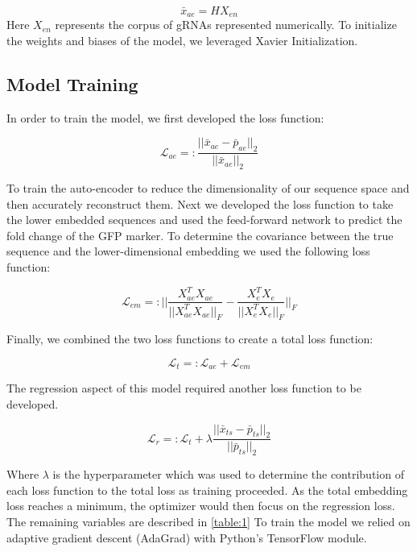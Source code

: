 \documentclass[times]{zHenriquesLab-StyleBioRxiv}
\begin{document}
\begin{equation}
\bar{x}_{ae} = HX_{en}
\end{equation}
Here $X_{en}$ represents the corpus of gRNAs represented numerically.
To initialize the weights and biases of the model, we leveraged Xavier Initialization\textsuperscript{\cite{pmlr-v9-glorot10a}}.

\subsection{Model Training}
In order to train the model, we first developed the loss function:

\begin{equation}
    \mathcal{L}_{ae} =: \frac{||\bar{x}_{ae}-\bar{p}_{ae}||_2}{||\bar{x}_{ae}||_2}
\end{equation}

To train the auto-encoder to reduce the dimensionality of our sequence space and then accurately reconstruct them. Next we developed the loss function to take the lower embedded sequences and used the feed-forward network to predict the fold change of the GFP marker. To determine the covariance between the true sequence and the lower-dimensional embedding we used the following loss function:

\begin{equation}
    \mathcal{L}_{em} =: ||\frac{X_{ae}^TX_{ae}}{||X_{ae}^TX_{ae}||_F}-\frac{X_{e}^TX_{e}}{||X_{e}^TX_{e}||_F}||_F 
\end{equation}

Finally, we combined the two loss functions to create a total loss function:

\begin{equation}
    \mathcal{L}_{t} =: \mathcal{L}_{ae}+\mathcal{L}_{em}
\end{equation}

The regression aspect of this model required another loss function to be developed.

\begin{equation}
    \mathcal{L}_{r} =: \mathcal{L}_{t} + \lambda \frac{||\bar{x}_{ts}-\bar{p}_{ts}||_2}{||\bar{p}_{ts}||_2}
\end{equation}

Where $\lambda$ is the hyperparameter which was used to determine the contribution of each loss function to the total loss as training proceeded. As the total embedding loss reaches a minimum, the optimizer would then focus on the regression loss. The remaining variables are described in \ref{table:1} To train the model we relied on adaptive gradient descent (AdaGrad) with Python's TensorFlow module.
\end{document}
